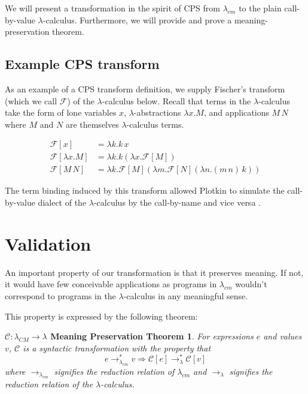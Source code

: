 \documentclass[ms]{byuprop}
\newcounter{definition}
\newcounter{example}
\newtheorem*{cmtheorem}{$\mathcal{C}:\lambda_{CM}\rightarrow\lambda$ Meaning Preservation Theorem}
\begin{document}
We will present a transformation in the spirit of CPS from $\lambda_{cm}$ to 
the plain call-by-value $\lambda$-calculus. Furthermore, we will provide and 
prove a meaning-preservation theorem.

\subsection{Example CPS transform}

As an example of a CPS transform definition, we supply Fischer's transform 
(which we call $\mathcal{F}$) of the $\lambda$-calculus 
\cite{fischer1972lambda} below. Recall that terms in 
the $\lambda$-calculus take the form of lone variables $x$, 
$\lambda$-abstractions $\lambda x.M$, and applications 
$M\,N$ where $M$ and $N$ are themselves $\lambda$-calculus terms.

\begin{align*}
\mathcal{F}[x]           &= \lambda k.k\,x\\
\mathcal{F}[\lambda x.M] &= \lambda k.k(\lambda x.\mathcal{F}[M])\\
\mathcal{F}[M\,N]       &= \lambda k.\mathcal{F}[M](\lambda m.\mathcal{F}[N](\lambda n.(m\,n)\,k))
\end{align*}

The term binding induced by this transform allowed Plotkin to simulate the call-by-value dialect of the $\lambda$-calculus by the call-by-name and vice versa \cite{plotkin1975call}.




\section{Validation}

An important property of our transformation is that it preserves meaning. If not, 
it would have few conceivable applications as programs in $\lambda_{cm}$ wouldn't 
correspond to programs in the $\lambda$-calculus in any meaningful sense.

This property is expressed by the following theorem:

\begin{cmtheorem}

For expressions $e$ and values $v$, $\mathcal{C}$ is a syntactic transformation with the 
property that
\[
e\rightarrow^{*}_{\lambda_{cm}}v\Rightarrow \mathcal{C}[e]\rightarrow^{*}_{\lambda}\mathcal{C}[v]
\]
where $\rightarrow_{\lambda_{cm}}$ signifies the reduction relation of $\lambda_{cm}$ 
and $\rightarrow_{\lambda}$ signifies the reduction relation of the $\lambda$-calculus.

\end{cmtheorem}
\end{document}
